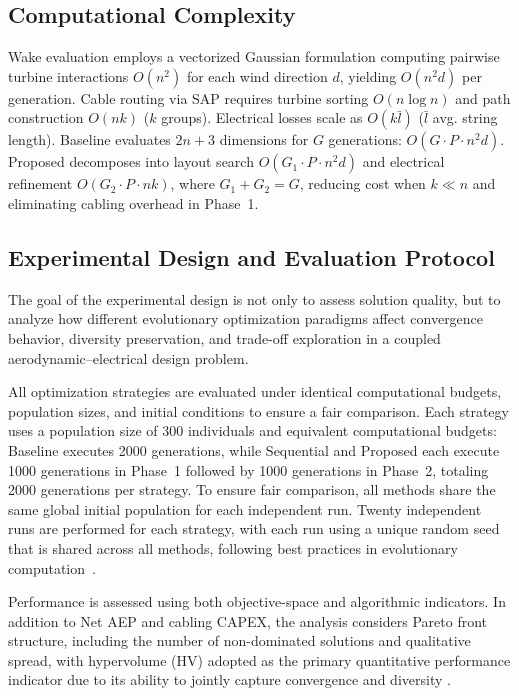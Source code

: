 \documentclass[format=sigconf,anonymous=true,review=true]{acmart}
\begin{document}
\subsection{Computational Complexity}
Wake evaluation employs a vectorized Gaussian formulation computing pairwise turbine interactions $O(n^2)$ for each wind direction $d$, yielding $O(n^2 d)$ per generation. Cable routing via SAP requires turbine sorting $O(n \log n)$ and path construction $O(nk)$ ($k$ groups). Electrical losses scale as $O(k\bar{l})$ ($\bar{l}$ avg. string length). Baseline evaluates $2n+3$ dimensions for $G$ generations: $O(G \cdot P \cdot n^2 d)$. Proposed decomposes into layout search $O(G_1 \cdot P \cdot n^2 d)$ and electrical refinement $O(G_2 \cdot P \cdot nk)$, where $G_1+G_2=G$, reducing cost when $k \ll n$ and eliminating cabling overhead in Phase~1.


\subsection{Experimental Design and Evaluation Protocol}
\label{sec:experimental_design}

The goal of the experimental design is not only to assess solution quality, but to analyze how different evolutionary optimization paradigms affect convergence behavior, diversity preservation, and trade-off exploration in a coupled aerodynamic--electrical design problem.

All optimization strategies are evaluated under identical computational budgets, population sizes, and initial conditions to ensure a fair comparison. Each strategy uses a population size of 300 individuals and equivalent computational budgets: Baseline executes 2000 generations, while Sequential and Proposed each execute 1000 generations in Phase~1 followed by 1000 generations in Phase~2, totaling 2000 generations per strategy. To ensure fair comparison, all methods share the same global initial population for each independent run. Twenty independent runs are performed for each strategy, with each run using a unique random seed that is shared across all methods, following best practices in evolutionary computation~\cite{Deb2002NSGA2, Haupt2004}.

Performance is assessed using both objective-space and algorithmic indicators. In addition to Net AEP and cabling CAPEX, the analysis considers Pareto front structure, including the number of non-dominated solutions and qualitative spread, with hypervolume (HV) adopted as the primary quantitative performance indicator due to its ability to jointly capture convergence and diversity \cite{Deb2002NSGA2}.
\end{document}
